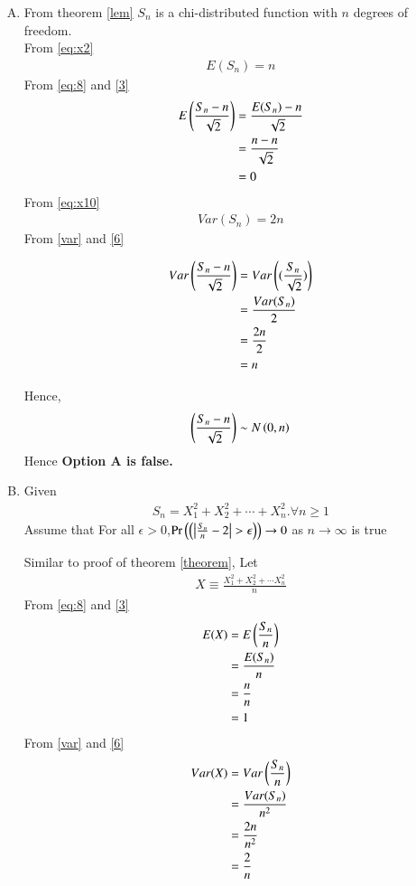\documentclass[journal,12pt,twocolumn]{IEEEtran}
\begin{document}
 \begin{enumerate}[(A)]
\item
From theorem \eqref{lem} $S_n$ is a chi-distributed function with $n$ degrees of freedom.\\
From \eqref{eq:x2} 
\begin{align}
    E(S_n)=n \label{eq:8}
\end{align}
From \eqref{eq:8} and \eqref{3}
\begin{align}
    E\left(\frac{S_{n}-n}{\sqrt{2}}\right)&=\frac{E(S_n)-n}{\sqrt{2}}\\
     &=\frac{n-n}{\sqrt{2}}\\
    &=0
\end{align}
From \eqref{eq:x10}
\begin{align}
    Var(S_n)= 2n\label{var}
\end{align}
From \eqref{var} and \eqref{6}

\begin{align}
    Var\left(\frac{S_{n}-n}{\sqrt{2}}\right)
    &= Var\left((\frac{S_n}{\sqrt{2}})\right)\\
    &=\frac{Var(S_n)}{2}\\
    &=\frac{2n}{2}\\
    &=n
\end{align}

Hence,
\begin{align}
    \left(\frac{S_{n}-n}{\sqrt{2}}\right)\sim N\left(0,n\right)
\end{align}
Hence \textbf{Option A is false.}



\item Given 
\begin{align}
    S_{n}=X_{1}^2+X_{2}^2+\cdots+X_{n}^2.\forall n\geq 1
\end{align}
Assume that For all $\epsilon > 0$,$\pr{\brak{\left|{\frac{S_n}{n}-2}\right|>\epsilon}}\to 0$ as $n \to \infty$ is true

Similar to proof of theorem \ref{theorem}, Let
\begin{align}
    X \equiv \frac{X_{1}^2+X_{2}^2+\cdots X_{n}^2}{n}
\end{align}
From \eqref{eq:8} and \eqref{3}
\begin{align}
    E(X)&=E\left(\frac{S_n}{n}\right)\\
        &=\frac{E(S_n)}{n}\\
        &=\frac{n}{n}\\
        &=1\label{25}
\end{align}
From \eqref{var} and \eqref{6}
\begin{align}
    Var(X)&=Var\brak{\frac{S_n}{n}}\\
    &=\frac{Var(S_n)}{n^2}\\
    &=\frac{2n}{n^2}\\
    &=\frac{2}{n} \label{26}
    

\end{align}
\end{enumerate}
\end{document}

